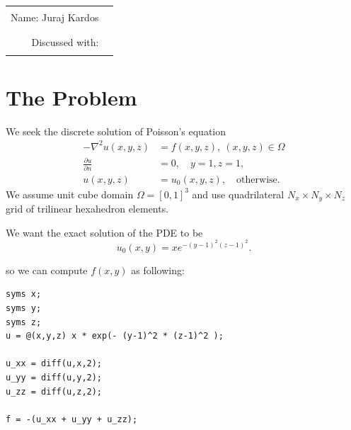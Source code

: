 \documentclass[unicode,11pt,a4paper,oneside,numbers=endperiod,openany]{scrartcl}
\begin{document}

\setassignment
{}
\newline

\begin{center}
\begin{tabular}{rc}
Name: Juraj Kardos   & \rule{5cm}{0.0pt} \\
Discussed with: & \rule{5cm}{0.0pt} 
\end{tabular}
\end{center}



\section{The Problem}
We seek the discrete solution of Poisson's equation
\begin{align}
    -\nabla^2 u(x,y,z) &= f(x,y,z),\ (x,y,z) \in \Omega \\
    \frac{\partial u}{\partial n} &= 0, \quad y=1, z=1, \\
    u(x,y,z) &= u_0(x,y,z), \quad \text{otherwise}.
\end{align}
We assume unit cube domain $\Omega = [0,1]^3$ and use quadrilateral $N_x \times N_y \times N_z$ grid of trilinear hexahedron elements.

We want the exact solution of the PDE to be 
\begin{equation}
u_0(x,y) = xe^{-(y-1)^2(z-1)^2}.
\end{equation}

so we can compute $f(x,y)$ as following:
\begin{lstlisting}
syms x;
syms y;
syms z;
u = @(x,y,z) x * exp(- (y-1)^2 * (z-1)^2 );

u_xx = diff(u,x,2);
u_yy = diff(u,y,2);
u_zz = diff(u,z,2);

f = -(u_xx + u_yy + u_zz);

\end{lstlisting}
\end{document}
